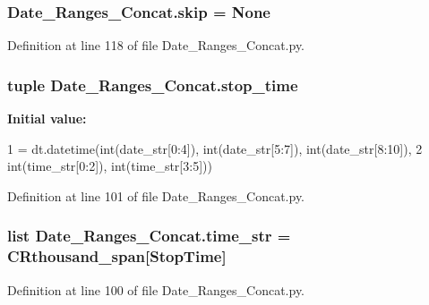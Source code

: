 \hypertarget{namespace_date___ranges___concat_ac79f5594c22369ee26b36b9bb99a6257}{}
\subsubsection[{skip}]{\setlength{\rightskip}{0pt plus 5cm}Date\+\_\+\+Ranges\+\_\+\+Concat.\+skip = None}\label{namespace_date___ranges___concat_ac79f5594c22369ee26b36b9bb99a6257}


Definition at line 118 of file Date\+\_\+\+Ranges\+\_\+\+Concat.\+py.

\hypertarget{namespace_date___ranges___concat_a16dab1ca25a0cecb2d7155a0ec870c8b}{}
\subsubsection[{stop\+\_\+time}]{\setlength{\rightskip}{0pt plus 5cm}tuple Date\+\_\+\+Ranges\+\_\+\+Concat.\+stop\+\_\+time}\label{namespace_date___ranges___concat_a16dab1ca25a0cecb2d7155a0ec870c8b}
{\bfseries Initial value\+:}
\begin{DoxyCode}
1 = dt.datetime(int(date\_str[0:4]), int(date\_str[5:7]), int(date\_str[8:10]),
2                                 int(time\_str[0:2]), int(time\_str[3:5]))
\end{DoxyCode}


Definition at line 101 of file Date\+\_\+\+Ranges\+\_\+\+Concat.\+py.

\hypertarget{namespace_date___ranges___concat_a2c27ffe6818fdec6a17cbfbab976f410}{}
\subsubsection[{time\+\_\+str}]{\setlength{\rightskip}{0pt plus 5cm}list Date\+\_\+\+Ranges\+\_\+\+Concat.\+time\+\_\+str = {\bf C\+Rthousand\+\_\+span}\mbox{[}\textquotesingle{}Stop\+Time\textquotesingle{}\mbox{]}}\label{namespace_date___ranges___concat_a2c27ffe6818fdec6a17cbfbab976f410}


Definition at line 100 of file Date\+\_\+\+Ranges\+\_\+\+Concat.\+py.

